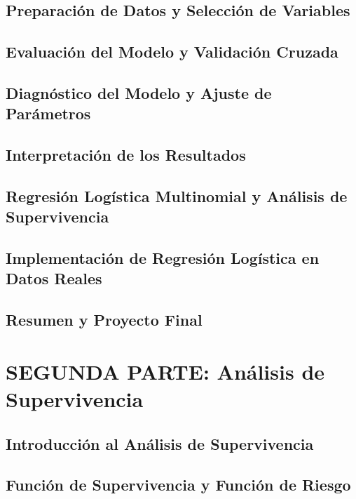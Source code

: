 \documentclass{report}
\begin{document}
\chapter{Preparación de Datos y Selección de Variables}


\chapter{Evaluación del Modelo y Validación Cruzada}


\chapter{Diagnóstico del Modelo y Ajuste de Parámetros}


\chapter{Interpretación de los Resultados}


\chapter{Regresión Logística Multinomial y Análisis de Supervivencia}


\chapter{Implementación de Regresión Logística en Datos Reales}


\chapter{Resumen y Proyecto Final}


\part{SEGUNDA PARTE: Análisis de Supervivencia}

\chapter{Introducción al Análisis de Supervivencia}


\chapter{Función de Supervivencia y Función de Riesgo}

\end{document}
